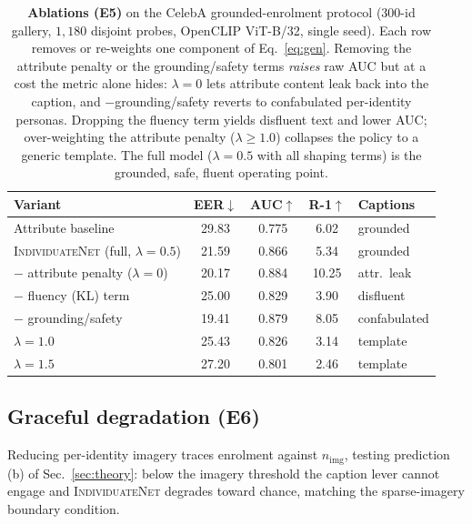 \documentclass[10pt,twocolumn,letterpaper]{article}
\newcommand{\method}{\textsc{IndividuateNet}}
\begin{document}
\begin{table}[t]
  \centering\small
  \setlength{\tabcolsep}{4pt}
  \begin{tabular}{@{}lcccl@{}}
    \toprule
    \textbf{Variant} & \textbf{EER}$\downarrow$ & \textbf{AUC}$\uparrow$ & \textbf{R-1}$\uparrow$ & \textbf{Captions} \\
    \midrule
    Attribute baseline               & 29.83 & 0.775 & 6.02  & grounded \\
    \midrule
    \method{} (full, $\lambda{=}0.5$) & 21.59 & 0.866 & 5.34  & grounded \\
    \;$-$ attribute penalty ($\lambda{=}0$) & 20.17 & 0.884 & 10.25 & attr.\ leak \\
    \;$-$ fluency (KL) term           & 25.00 & 0.829 & 3.90  & disfluent \\
    \;$-$ grounding/safety            & 19.41 & 0.879 & 8.05  & confabulated \\
    \;$\lambda{=}1.0$                 & 25.43 & 0.826 & 3.14  & template \\
    \;$\lambda{=}1.5$                 & 27.20 & 0.801 & 2.46  & template \\
    \bottomrule
  \end{tabular}
  \caption{\textbf{Ablations (E5)} on the CelebA grounded-enrolment protocol
  (300-id gallery, $1{,}180$ disjoint probes, OpenCLIP ViT-B/32, single seed).
  Each row removes or re-weights one component of Eq.~\ref{eq:gen}. Removing the
  attribute penalty or the grounding/safety terms \emph{raises} raw AUC but at a
  cost the metric alone hides: $\lambda{=}0$ lets attribute content leak back into
  the caption, and $-$grounding/safety reverts to confabulated per-identity
  personas. Dropping the fluency term yields disfluent text and lower AUC;
  over-weighting the attribute penalty ($\lambda{\ge}1.0$) collapses the policy to
  a generic template. The full model ($\lambda{=}0.5$ with all shaping terms) is
  the grounded, safe, fluent operating point.}
  \label{tab:ablation}
\end{table}

\subsection{Graceful degradation (E6)}
\label{sec:e6}
Reducing per-identity imagery traces enrolment against $n_{\text{img}}$, testing prediction (b)
of Sec.~\ref{sec:theory}: below the imagery threshold the caption lever cannot engage and
\method{} degrades toward chance, matching the sparse-imagery boundary condition.
\end{document}
